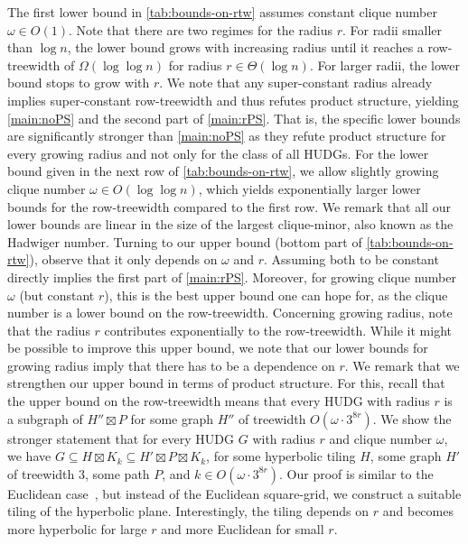 %
The first lower bound in \cref{tab:bounds-on-rtw} assumes constant clique number $\omega \in O(1)$.
Note that there are two regimes for the radius $r$.
For radii smaller than $\log n$, the lower bound grows with increasing radius until it reaches a row-treewidth of $\Omega(\log\log n)$ for radius $r \in \Theta(\log n)$.
For larger radii, the lower bound stops to grow with $ r $.
We note that any super-constant radius already implies super-constant row-treewidth and thus refutes product structure, yielding \cref{main:noPS} and the second part of \cref{main:rPS}.
That is, the specific lower bounds are significantly stronger than \cref{main:noPS} as they refute product structure for every growing radius and not only for the class of all HUDGs.
%
For the lower bound given in the next row of \cref{tab:bounds-on-rtw}, we allow slightly growing clique number $\omega \in O(\log \log n)$, which yields exponentially larger lower bounds for the row-treewidth compared to the first row.
We remark that all our lower bounds are linear in the size of the largest clique-minor, also known as the Hadwiger number.
%
Turning to our upper bound (bottom part of \cref{tab:bounds-on-rtw}), observe that it only depends on $\omega$ and $r$.
Assuming both to be constant directly implies the first part of \cref{main:rPS}.
Moreover, for growing clique number $\omega$ (but constant $r$), this is the best upper bound one can hope for, as the clique number is a lower bound on the row-treewidth.
Concerning growing radius, note that the radius $r$ contributes exponentially to the row-treewidth.
While it might be possible to improve this upper bound, we note that our lower bounds for growing radius imply that there has to be a dependence on $r$.
We remark that we strengthen our upper bound in terms of product structure.
For this, recall that the upper bound on the row-treewidth means that every HUDG with radius $ r $ is a subgraph of $ H'' \boxtimes P $ for some graph $ H'' $ of treewidth $ O(\omega \cdot 3^{8r}) $.
We show the stronger statement that for every HUDG $ G $ with radius $r$ and clique number $\omega$, we have $G \subseteq H \boxtimes K_k \subseteq H' \boxtimes P \boxtimes K_{k}$, for some hyperbolic tiling $ H $, some graph $H'$ of treewidth $3$, some path $P$, and $k \in O(\omega \cdot 3^{8r})$.
Our proof is similar to the Euclidean case~\cite{dvorak_notes_2021}, but instead of the Euclidean square-grid, we construct a suitable tiling of the hyperbolic plane.
Interestingly, the tiling depends on $r$ and becomes more hyperbolic for large $ r $ and more Euclidean for small $ r $.
